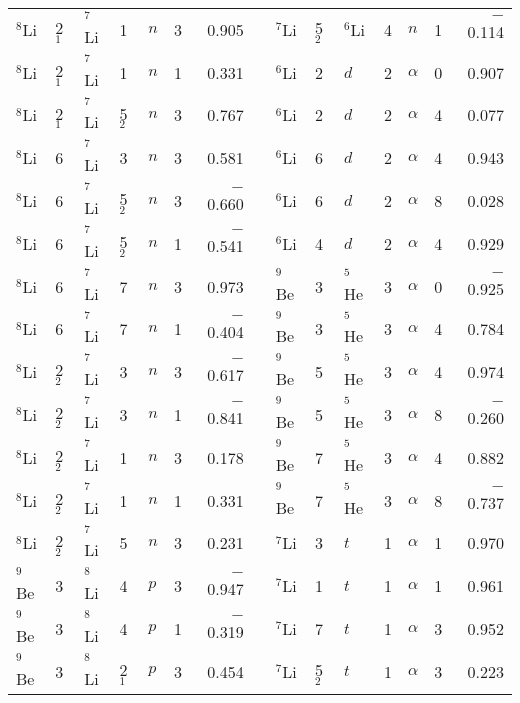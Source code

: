 \documentclass[
12pt, %
oneside, %
english, %
doublespacing, %
doublespacing, %
toctotoc, %
parskip, %
headsepline, %
]{MastersDoctoralThesis} %
\begin{document}
\begin{table*}[tp]
\begin{tabular*}{\textwidth}{@{\extracolsep{\fill}}llllllrl@{\extracolsep{\fill}}llllllr@{\extracolsep{\fill}}}
$^8$Li  & 2$_1$  & ${}^7$Li   & 1   & $n$       & 3   & 0.905  &  & ${}^7$Li  & 5$_2$  & ${}^6$Li   & 4   & $n$       & 1   & $-$0.114  \\
$^8$Li  & 2$_1$  & ${}^7$Li   & 1   & $n$       & 1   & 0.331  &  & ${}^6$Li  & 2  & $d$     & 2   & $\alpha$     & 0   & 0.907  \\
$^8$Li  & 2$_1$  & ${}^7$Li   & 5$_2$   & $n$       & 3   & 0.767  &  & ${}^6$Li  & 2  & $d$     & 2   & $\alpha$     & 4   & 0.077   \\
$^8$Li  & 6  & ${}^7$Li   & 3   & $n$       & 3   & 0.581  &  & ${}^6$Li  & 6  & $d$     & 2   & $\alpha$     & 4   & 0.943   \\
$^8$Li  & 6  & ${}^7$Li   & 5$_2$   & $n$       & 3   & $-$0.660  &  & ${}^6$Li  & 6  & $d$     & 2   & $\alpha$     & 8   & 0.028   \\
$^8$Li  & 6  & ${}^7$Li   & 5$_2$   & $n$       & 1   & $-$0.541 &  & ${}^6$Li  & 4  & $d$     & 2   & $\alpha$     & 4   & 0.929   \\
$^8$Li  & 6  & ${}^7$Li   & 7   & $n$       & 3   & 0.973  &  & ${}^9$Be  & 3  & ${}^5$He   & 3   & $\alpha$     & 0   & $-$0.925  \\
$^8$Li  & 6  & ${}^7$Li   & 7   & $n$       & 1   & $-$0.404 &  & ${}^9$Be  & 3  & ${}^5$He   & 3   & $\alpha$     & 4   & 0.784   \\
$^8$Li  & 2$_2$  & ${}^7$Li   & 3   & $n$       & 3   & $-$0.617 &  & ${}^9$Be  & 5  & ${}^5$He   & 3   & $\alpha$     & 4   & 0.974   \\
$^8$Li  & 2$_2$  & ${}^7$Li   & 3   & $n$       & 1   & $-$0.841 &  & ${}^9$Be  & 5  & ${}^5$He   & 3   & $\alpha$     & 8   & $-$0.260   \\
$^8$Li  & 2$_2$  & ${}^7$Li   & 1   & $n$       & 3   & 0.178  &  & ${}^9$Be  & 7  & ${}^5$He   & 3   & $\alpha$     & 4   & 0.882   \\
$^8$Li  & 2$_2$  & ${}^7$Li   & 1   & $n$       & 1   & 0.331  &  & ${}^9$Be  & 7  & ${}^5$He   & 3   & $\alpha$     & 8   & $-$0.737  \\
$^8$Li  & 2$_2$  & ${}^7$Li   & 5   & $n$       & 3   & 0.231  &  & ${}^7$Li  & 3  & $t$     & 1   & $\alpha$     & 1   & 0.970       \\
$^9$Be  & 3  & ${}^8$Li    & 4   & $p$       & 3   & $-$0.947 &  & ${}^7$Li  & 1  & $t$     & 1   & $\alpha$     & 1   & 0.961       \\
$^9$Be  & 3  & ${}^8$Li    & 4   & $p$       & 1   & $-$0.319 &  & ${}^7$Li  & 7  & $t$     & 1   & $\alpha$     & 3   & 0.952       \\
$^9$Be  & 3  & ${}^8$Li    & 2$_1$   & $p$       & 3   & 0.454  &  & ${}^7$Li  & 5$_2$  & $t$     & 1   & $\alpha$     & 3   & 0.223  \\
\bottomrule
\end{tabular*}
\end{table*}
\end{document}
